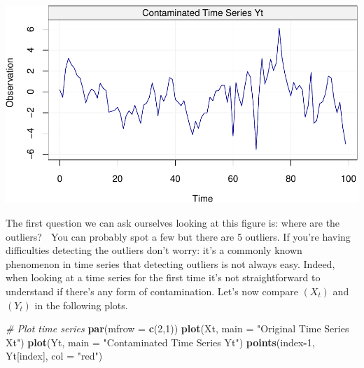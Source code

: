 \documentclass[]{book}
\newenvironment{Shaded}{\begin{snugshade}}{\end{snugshade}}
\newcommand{\KeywordTok}[1]{\textcolor[rgb]{0.13,0.29,0.53}{\textbf{#1}}}
\newcommand{\DataTypeTok}[1]{\textcolor[rgb]{0.13,0.29,0.53}{#1}}
\newcommand{\DecValTok}[1]{\textcolor[rgb]{0.00,0.00,0.81}{#1}}
\newcommand{\StringTok}[1]{\textcolor[rgb]{0.31,0.60,0.02}{#1}}
\newcommand{\CommentTok}[1]{\textcolor[rgb]{0.56,0.35,0.01}{\textit{#1}}}
\newcommand{\OperatorTok}[1]{\textcolor[rgb]{0.81,0.36,0.00}{\textbf{#1}}}
\newcommand{\NormalTok}[1]{#1}
\theoremstyle{definition}
\theoremstyle{definition}
\theoremstyle{definition}
\theoremstyle{remark}
\begin{document}
\includegraphics{ts_files/figure-latex/Yt-1.pdf}

The first question we can ask ourselves looking at this figure is: where
are the outliers? 🤔 You can probably spot a few but there are 5
outliers. If you're having difficulties detecting the outliers don't
worry: it's a commonly known phenomenon in time series that detecting
outliers is not always easy. Indeed, when looking at a time series for
the first time it's not straightforward to understand if there's any
form of contamination. Let's now compare \((X_t)\) and \((Y_t)\) in the
following plots.

\begin{Shaded}
\begin{Highlighting}[]
\CommentTok{# Plot time series}
\KeywordTok{par}\NormalTok{(}\DataTypeTok{mfrow =} \KeywordTok{c}\NormalTok{(}\DecValTok{2}\NormalTok{,}\DecValTok{1}\NormalTok{))}
\KeywordTok{plot}\NormalTok{(Xt, }\DataTypeTok{main =} \StringTok{"Original Time Series Xt"}\NormalTok{)}
\KeywordTok{plot}\NormalTok{(Yt, }\DataTypeTok{main =} \StringTok{"Contaminated Time Series Yt"}\NormalTok{)}
\KeywordTok{points}\NormalTok{(index}\OperatorTok{-}\DecValTok{1}\NormalTok{, Yt[index], }\DataTypeTok{col =} \StringTok{"red"}\NormalTok{)}
\end{Highlighting}
\end{Shaded}
\end{document}

